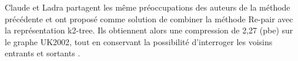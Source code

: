 
Claude et Ladra \citep{claude2011practical} partagent les même préoccupations des auteurs de la méthode précédente et ont proposé comme solution de combiner la méthode Re-pair avec la représentation k2-tree. Ils obtiennent alors une compression de 2,27 (pbe) sur le graphe UK2002, tout en conservant la possibilité d'interroger les voisins entrants et sortants \citep{maneth2015survey}.